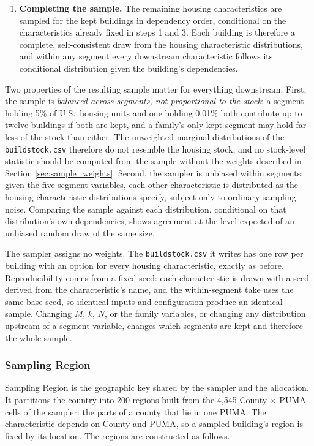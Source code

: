 \begin{enumerate}
    \item \textbf{Completing the sample.} The remaining housing characteristics are sampled for the kept buildings in dependency order, conditional on the characteristics already fixed in steps 1 and 3. Each building is therefore a complete, self-consistent draw from the housing characteristic distributions, and within any segment every downstream characteristic follows its conditional distribution given the building's dependencies.
\end{enumerate}

Two properties of the resulting sample matter for everything downstream. First, the sample is \textit{balanced across segments, not proportional to the stock}: a segment holding 5\% of U.S.~housing units and one holding 0.01\% both contribute up to twelve buildings if both are kept, and a family's only kept segment may hold far less of the stock than either. The unweighted marginal distributions of the \texttt{buildstock.csv} therefore do not resemble the housing stock, and no stock-level statistic should be computed from the sample without the weights described in Section \ref{sec:sample_weights}. Second, the sampler is unbiased within segments: given the five segment variables, each other characteristic is distributed as the housing characteristic distributions specify, subject only to ordinary sampling noise. Comparing the sample against each distribution, conditional on that distribution's own dependencies, shows agreement at the level expected of an unbiased random draw of the same size.

The sampler assigns no weights. The \texttt{buildstock.csv} it writes has one row per building with an option for every housing characteristic, exactly as before. Reproducibility comes from a fixed seed: each characteristic is drawn with a seed derived from the characteristic's name, and the within-segment take uses the same base seed, so identical inputs and configuration produce an identical sample. Changing $M$, $k$, $N$, or the family variables, or changing any distribution upstream of a segment variable, changes which segments are kept and therefore the whole sample.

\subsubsection{Sampling Region}\label{sec:sampling_region_characteristic}
Sampling Region is the geographic key shared by the sampler and the allocation. It partitions the country into 200 regions built from the 4,545 County $\times$ PUMA cells of the sampler: the parts of a county that lie in one PUMA. The characteristic depends on County and PUMA, so a sampled building's region is fixed by its location. The regions are constructed as follows.


